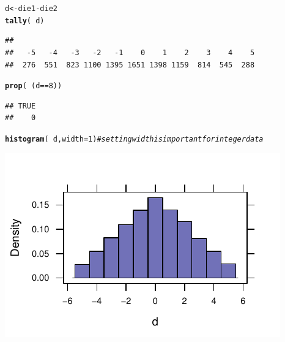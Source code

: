 \documentclass[twoside]{book}\usepackage[]{graphicx}\usepackage[]{xcolor}
\makeatletter
\def\maxwidth{ %
  \ifdim\Gin@nat@width>\linewidth
    \linewidth
  \else
    \Gin@nat@width
  \fi
}
\newcommand{\hlnum}[1]{\textcolor[rgb]{0.686,0.059,0.569}{#1}}%
\newcommand{\hlcom}[1]{\textcolor[rgb]{0.678,0.584,0.686}{\textit{#1}}}%
\newcommand{\hlopt}[1]{\textcolor[rgb]{0,0,0}{#1}}%
\newcommand{\hlstd}[1]{\textcolor[rgb]{0.345,0.345,0.345}{#1}}%
\newcommand{\hlkwb}[1]{\textcolor[rgb]{0.69,0.353,0.396}{#1}}%
\newcommand{\hlkwc}[1]{\textcolor[rgb]{0.333,0.667,0.333}{#1}}%
\newcommand{\hlkwd}[1]{\textcolor[rgb]{0.737,0.353,0.396}{\textbf{#1}}}%
\newenvironment{kframe}{%
 \def\at@end@of@kframe{}%
 \ifinner\ifhmode%
  \def\at@end@of@kframe{\end{minipage}}%
  \begin{minipage}{\columnwidth}%
 \fi\fi%
 \def\FrameCommand##1{\hskip\@totalleftmargin \hskip-\fboxsep
 \colorbox{shadecolor}{##1}\hskip-\fboxsep
     \hskip-\linewidth \hskip-\@totalleftmargin \hskip\columnwidth}%
 \MakeFramed {\advance\hsize-\width
   \@totalleftmargin\z@ \linewidth\hsize
   \@setminipage}}%
 {\par\unskip\endMakeFramed%
 \at@end@of@kframe}
\newenvironment{knitrout}{}{} %
\makeatother
\begin{document}
\begin{solution}
\begin{knitrout}
\color{fgcolor}\begin{kframe}
\begin{alltt}
\hlstd{d} \hlkwb{<-} \hlstd{die1} \hlopt{-} \hlstd{die2}
\hlkwd{tally}\hlstd{(}\hlopt{~}\hlstd{d)}
\end{alltt}
\begin{verbatim}
## 
##   -5   -4   -3   -2   -1    0    1    2    3    4    5 
##  276  551  823 1100 1395 1651 1398 1159  814  545  288
\end{verbatim}
\begin{alltt}
\hlkwd{prop}\hlstd{(}\hlopt{~}\hlstd{(d} \hlopt{==} \hlnum{8}\hlstd{))}
\end{alltt}


{\ttfamily\noindent\itshape\color{messagecolor}{\#\#\ \ \ \  target level: TRUE;\ \ other levels: FALSE}}\begin{verbatim}
## TRUE 
##    0
\end{verbatim}
\begin{alltt}
\hlkwd{histogram}\hlstd{(}\hlopt{~}\hlstd{d,} \hlkwc{width} \hlstd{=} \hlnum{1}\hlstd{)}  \hlcom{# setting width is important for integer data}
\end{alltt}
\end{kframe}

{\centering \includegraphics[width=\maxwidth]{figures/fig-unnamed-chunk-54-1} 

}



\end{knitrout}
\end{solution}
\end{document}
